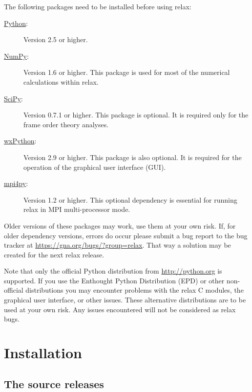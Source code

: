 The following packages need to be installed before using relax:
\begin{description}
  \item[\href{http://python.org/}{Python}:]  Version 2.5 or higher.
  \item[\href{http://numpy.scipy.org/}{NumPy}:]  Version 1.6 or higher.
    This package is used for most of the numerical calculations within relax.
  \item[\href{http://www.scipy.org/}{SciPy}:]  Version 0.7.1 or higher.
    This package is optional.
    It is required only for the frame order theory analyses.
  \item[\href{http://wxpython.org/}{wxPython}:]  Version 2.9 or higher.
    This package is also optional.
    It is required for the operation of the graphical user interface (GUI).
  \item[\href{http://mpi4py.scipy.org/}{mpi4py}:]  Version 1.2 or higher.
    This optional dependency is essential for running relax in MPI multi-processor mode.
\end{description}

Older versions of these packages may work, use them at your own risk.
If, for older dependency versions, errors do occur please submit a bug report to the bug tracker at \href{https://gna.org/bugs/?group=relax}{https://gna.org/bugs/?group=relax}.
That way a solution may be created for the next relax release.

Note that only the official Python distribution from \href{http://python.org}{http://python.org} is supported.
If you use the Enthought Python Distribution (EPD) or other non-official distributions you may encounter problems with the relax C modules, the graphical user interface, or other issues.
These alternative distributions are to be used at your own risk.
Any issues encountered will not be considered as relax bugs.



\section{Installation}


\subsection{The source releases}
\label{sect: source releases}

